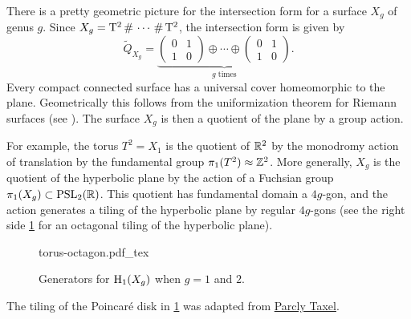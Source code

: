 \begin{example}
	There is a pretty geometric picture for the intersection form for a surface $X_g$ of genus $g$. Since $X_g=\T^2\+\cdots\+\T^2$, the intersection form is given by
	\[
		\widetilde{Q}_{X_g} = \underbrace{\begin{pmatrix}0&1\\1&0\end{pmatrix}\oplus\cdots\oplus \begin{pmatrix}0&1\\1&0\end{pmatrix}}_{g\textrm{ times}}.
	\]
	Every compact connected surface has a universal cover homeomorphic to the plane. Geometrically this follows from the uniformization theorem for Riemann surfaces (see \cite{forster1991}). The surface $X_g$ is then a quotient of the plane by a group action. 

	For example, the torus $T^2=X_1$ is the quotient of $\mathbb{R}^2$ by the monodromy action of translation by the fundamental group $\pi_1(T^2)\approx \mathbb{Z}^2$. More generally, $X_g$ is the quotient of the hyperbolic plane by the action of a Fuchsian group $\pi_1(X_g)\subset \mathrm{PSL}_2(\mathbb{R})$. This quotient has fundamental domain a $4g$-gon, and the action generates a tiling of the hyperbolic plane by regular $4g$-gons (see the right side \cref{fig:torus-octagon} for an octagonal tiling of the hyperbolic plane).

	\begin{figure}[ht]
		\centering
		{torus-octagon.pdf_tex}
		\caption{Generators for $\operatorname{H}_1(X_g)$ when $g=1$ and $2$.}\label{fig:torus-octagon}
	\end{figure}

	\begin{remark*}
		The tiling of the Poincar\'e disk in \cref{fig:torus-octagon} was adapted from \href{https://commons.wikimedia.org/wiki/User:Parcly_Taxel}{Parcly Taxel}.
	\end{remark*}


\end{example}
